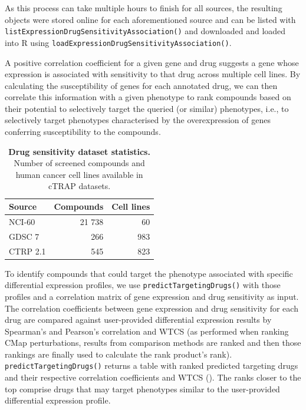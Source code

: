 As this process can take multiple hours to finish for all sources, the resulting objects were stored online for each aforementioned source and can be listed with \texttt{listExpressionDrugSensitivityAssociation()} and downloaded and loaded into R using \texttt{loadExpressionDrugSensitivityAssociation()}.

A positive correlation coefficient for a given gene and drug suggests a gene whose expression is associated with sensitivity to that drug across multiple cell lines. By calculating the susceptibility of genes for each annotated drug, we can then correlate this information with a given phenotype to rank compounds based on their potential to selectively target the queried (or similar) phenotypes, i.e., to selectively target phenotypes characterised by the overexpression of genes conferring susceptibility to the compounds.

\begin{table}
\centering
\parnotereset
\small
\caption[Drug sensitivity datasets statistics]{\textbf{Drug sensitivity dataset statistics.} Number of screened compounds and human cancer cell lines available in cTRAP datasets.}
\label{tab:drug-sensitivity-datasets}
\begin{tabularx}{.45\textwidth}{ l r r }
\toprule
\textbf{Source}   & \textbf{Compounds} & \textbf{Cell lines} \\
\midrule
NCI-60            &             21 738 &   60 \\
GDSC 7            &                266 &  983 \\
CTRP 2.1          &                545 &  823 \\
\bottomrule
\end{tabularx}
\parnotes
\end{table}

To identify compounds that could target the phenotype associated with specific differential expression profiles, we use \texttt{predictTargetingDrugs()} with those profiles and a correlation matrix of gene expression and drug sensitivity as input. The correlation coefficients between gene expression and drug sensitivity for each drug are compared against user-provided differential expression results by Spearman’s and Pearson’s correlation and WTCS (as performed when ranking CMap perturbations, results from comparison methods are ranked and then those rankings are finally used to calculate the rank product’s rank). \texttt{predictTargetingDrugs()} returns a table with ranked predicted targeting drugs and their respective correlation coefficients and WTCS (). The ranks closer to the top comprise drugs that may target phenotypes similar to the user-provided differential expression profile.

